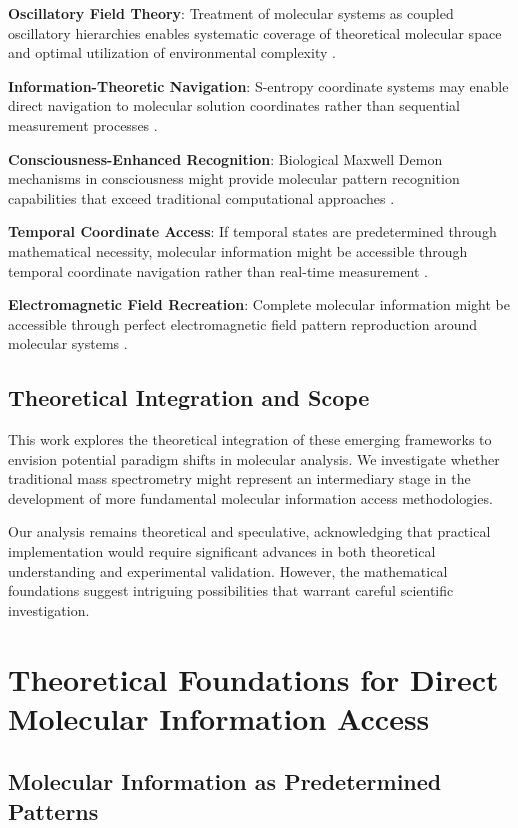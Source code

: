 \documentclass[11pt,a4paper]{article}
\theoremstyle{remark}
\begin{document}
\textbf{Oscillatory Field Theory}: Treatment of molecular systems as coupled oscillatory hierarchies enables systematic coverage of theoretical molecular space and optimal utilization of environmental complexity \cite{sachikonye2024oscillatory}.

\textbf{Information-Theoretic Navigation}: S-entropy coordinate systems may enable direct navigation to molecular solution coordinates rather than sequential measurement processes \cite{sachikonye2024sentropy}.

\textbf{Consciousness-Enhanced Recognition}: Biological Maxwell Demon mechanisms in consciousness might provide molecular pattern recognition capabilities that exceed traditional computational approaches \cite{sachikonye2024consciousness}.

\textbf{Temporal Coordinate Access}: If temporal states are predetermined through mathematical necessity, molecular information might be accessible through temporal coordinate navigation rather than real-time measurement \cite{sachikonye2024temporal}.

\textbf{Electromagnetic Field Recreation}: Complete molecular information might be accessible through perfect electromagnetic field pattern reproduction around molecular systems \cite{sachikonye2024electromagnetic}.

\subsection{Theoretical Integration and Scope}

This work explores the theoretical integration of these emerging frameworks to envision potential paradigm shifts in molecular analysis. We investigate whether traditional mass spectrometry might represent an intermediary stage in the development of more fundamental molecular information access methodologies.

Our analysis remains theoretical and speculative, acknowledging that practical implementation would require significant advances in both theoretical understanding and experimental validation. However, the mathematical foundations suggest intriguing possibilities that warrant careful scientific investigation.

\section{Theoretical Foundations for Direct Molecular Information Access}

\subsection{Molecular Information as Predetermined Patterns}
\end{document}
